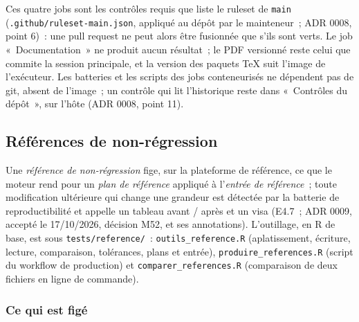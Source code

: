 \documentclass[a4paper,11pt]{article}
\newcommand{\code}[1]{\texttt{\small #1}}
\begin{document}
\noindent
Ces quatre jobs sont les contrôles requis que liste le ruleset de \code{main}
(\code{.github/ruleset-main.json}, appliqué au dépôt par le mainteneur~;
ADR 0008, point 6)~: une pull request ne peut alors être fusionnée que s'ils
sont verts. Le job «~Documentation~» ne produit aucun résultat~; le PDF
versionné reste celui que commite la session principale, et la version des
paquets TeX suit l'image de l'exécuteur. Les batteries et les
scripts des jobs conteneurisés ne dépendent pas de git, absent de l'image~;
un contrôle qui lit l'historique reste dans «~Contrôles du dépôt~», sur l'hôte
(ADR 0008, point 11).

\subsection{Références de non-régression}
\label{sec:non-regression}

Une \emph{référence de non-régression} fige, sur la plateforme de référence,
ce que le moteur rend pour un \emph{plan de référence} appliqué à l'\emph{entrée
de référence}~; toute modification ultérieure qui change une grandeur est
détectée par la batterie de reproductibilité et appelle un tableau avant /
après et un visa (E4.7~; ADR 0009, accepté le 17/10/2026, décision M52, et
ses annotations). L'outillage, en R de base, est sous \code{tests/reference/}~:
\code{outils\_reference.R} (aplatissement, écriture, lecture, comparaison,
tolérances, plans et entrée), \code{produire\_references.R} (script du
workflow de production) et \code{comparer\_references.R} (comparaison de deux
fichiers en ligne de commande).

\subsubsection*{Ce qui est figé}
\end{document}
